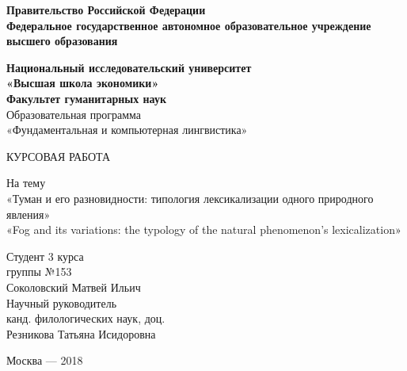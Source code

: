 \thispagestyle{empty}
\begin{center}
\noindent 
\textbf{Правительство Российской Федерации \\Федеральное государственное автономное образовательное учреждение высшего образования}

\textbf{Национальный исследовательский университет}\\
\textbf{«Высшая школа экономики»}\\
\textbf{Факультет гуманитарных наук}\bigskip\\
\vfill
Образовательная программа \\
  «Фундаментальная и компьютерная лингвистика»\\
\vfill

\huge{КУРСОВАЯ РАБОТА}\\
\large

На тему \\
\Large
«Туман и его разновидности: типология лексикализации одного природного явления»\\
«Fog and its variations: the typology of the natural phenomenon's lexicalization»\\
\vfill
\vfill
\normalsize
\begin{flushright}
Студент 3 курса\\
группы №153 \\
Соколовский Матвей Ильич\bigskip\\
                       
Научный руководитель\\
канд. филологических наук, доц.\\
Резникова Татьяна Исидоровна\\

\end{flushright}
\vfill
\begin{center}
Москва --- 2018
\end{center}

\end{center}
\pagebreak